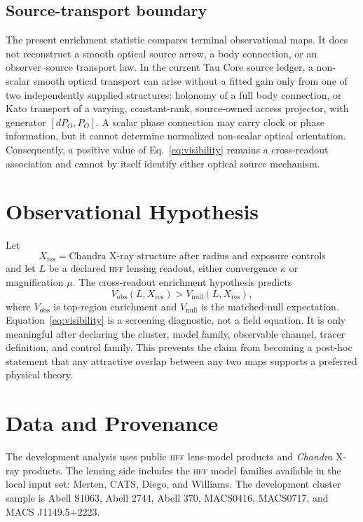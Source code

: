\documentclass[11pt,a4paper]{article}
\newcommand{\HFF}{\textsc{hff}}
\newcommand{\Chandra}{\textit{Chandra}}
\newcommand{\Xres}{X_{\mathrm{res}}}
\newcommand{\Vobs}{V_{\mathrm{obs}}}
\newcommand{\Vnull}{V_{\mathrm{null}}}
\begin{document}
\subsection{Source-transport boundary}

The present enrichment statistic compares terminal observational maps. It
does not reconstruct a smooth optical source arrow, a body connection, or an
observer--source transport law. In the current Tau Core source ledger, a
non-scalar smooth optical transport can arise without a fitted gain only from
one of two independently supplied structures: holonomy of a full body
connection, or Kato transport of a varying, constant-rank, source-owned access
projector, with generator \([dP_O,P_O]\). A scalar phase connection may carry
clock or phase information, but it cannot determine normalized non-scalar
optical orientation. Consequently, a positive value of
Eq.~\eqref{eq:visibility} remains a cross-readout association and cannot by
itself identify either optical source mechanism.

\section{Observational Hypothesis}

Let
\begin{equation}
\Xres = \text{Chandra X-ray structure after radius and exposure controls}
\end{equation}
and let $L$ be a declared \HFF{} lensing readout, either convergence $\kappa$ or
magnification $\mu$. The cross-readout enrichment hypothesis predicts
\begin{equation}
\Vobs(L,\Xres) > \Vnull(L,\Xres),
\label{eq:visibility}
\end{equation}
where $\Vobs$ is top-region enrichment and $\Vnull$ is the matched-null
expectation. Equation~\ref{eq:visibility} is a screening diagnostic, not a
field equation. It is only meaningful after declaring the cluster, model
family, observable channel, tracer definition, and control family. This
prevents the claim from becoming a post-hoc statement that any attractive
overlap between any two maps supports a preferred physical theory.

\section{Data and Provenance}

The development analysis uses public \HFF{} lens-model products and
\Chandra{} X-ray products. The lensing side includes the \HFF{} model families
available in the local input set: Merten, CATS, Diego, and Williams. The
development cluster sample is Abell S1063, Abell 2744, Abell 370, MACS0416,
MACS0717, and MACS J1149.5+2223.
\end{document}
